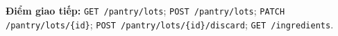 \textbf{Điểm giao tiếp:} {\small\texttt{GET /\allowbreak{}\allowbreak{}pantry/\allowbreak{}\allowbreak{}lots}}; {\small\texttt{POST /\allowbreak{}\allowbreak{}pantry/\allowbreak{}\allowbreak{}lots}}; {\small\texttt{PATCH /\allowbreak{}\allowbreak{}pantry/\allowbreak{}\allowbreak{}lots/\allowbreak{}\allowbreak{}\{id\}}}; {\small\texttt{POST /\allowbreak{}\allowbreak{}pantry/\allowbreak{}\allowbreak{}lots/\allowbreak{}\allowbreak{}\{id\}/\allowbreak{}\allowbreak{}discard}}; {\small\texttt{GET /\allowbreak{}\allowbreak{}ingredients}}.
